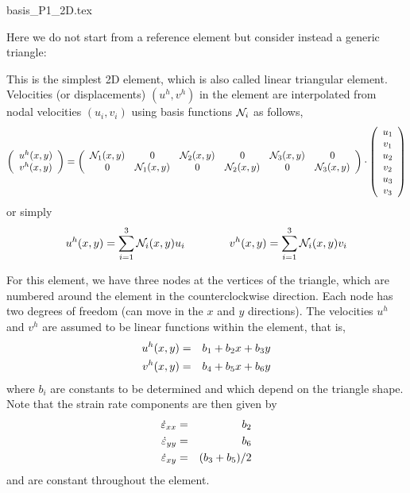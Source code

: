 \begin{flushright} {\tiny {\color{gray} basis\_P1\_2D.tex}} \end{flushright}

Here we do not start from a reference element but consider instead a generic triangle:



This is the simplest 2D element, which is also called linear triangular element.
Velocities (or displacements) $(u^h,v^h)$ in the element are interpolated from nodal velocities
$(u_i,v_i)$ using basis functions ${\mathcal{N}}_i$ as follows,
\[
\left(
\begin{array}{c}
u^h(x,y) \\v^h(x,y)
\end{array}
\right)
=
\left(
\begin{array}{cccccc}
{\mathcal{N}}_1(x,y) & 0 & {\mathcal{N}}_2(x,y) & 0 & {\mathcal{N}}_3(x,y) & 0\\
0 & {\mathcal{N}}_1(x,y) & 0 & {\mathcal{N}}_2(x,y) & 0 & {\mathcal{N}}_3(x,y)\\
\end{array}
\right)
\cdot
\left(
\begin{array}{c}
u_1 \\ v_1 \\ u_2 \\ v_2 \\ u_3 \\ v_3
\end{array}
\right)
\]
or simply 
\[
u^h(x,y)=\sum_{i=1}^3 {\mathcal{N}}_i(x,y) u_i
\qquad
\qquad
v^h(x,y)=\sum_{i=1}^3 {\mathcal{N}}_i(x,y) v_i
\]

For this element, we have three nodes at the vertices of the triangle, which are 
numbered around the element in the counterclockwise direction. 
Each node has two degrees of freedom (can move in the $x$ and $y$ directions). 
The velocities $u^h$ and $v^h$ are assumed to be linear functions within the element, that is, 
\begin{eqnarray}
u^h(x,y)&=&b_1 +b_2x+b_3y \nonumber\\
v^h(x,y)&=&b_4 +b_5x+b_6y
\end{eqnarray}
where $b_i$ are constants to be determined and which depend on the triangle shape.
Note that the strain rate components are then given by
\begin{eqnarray}
\dot\varepsilon_{xx}&=&b_2  \nonumber\\
\dot\varepsilon_{yy}&=&b_6  \nonumber\\
\dot\varepsilon_{xy}&=&(b_3+b_5)/2 \nonumber
\end{eqnarray}
and are constant throughout the element.

